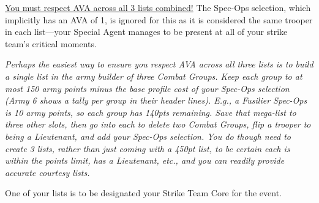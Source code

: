   \underline{You must respect AVA across all 3 lists
  combined!}  The Spec-Ops selection, which implicitly has an AVA of
1, is ignored for this as it is considered the same trooper in each
list---your Special Agent manages to be present at all of your strike
team's critical moments.

\textit{Perhaps the easiest way to ensure you respect AVA across all
  three lists is to build a single list in the army builder of three
  Combat Groups.  Keep each group to at most 150 army points minus the
  base profile cost of your Spec-Ops selection (Army 6 shows a tally
  per group in their header lines).  E.g., a Fusilier Spec-Ops is 10
  army points, so each group has 140pts remaining.  Save that
  mega-list to three other slots, then go into each to delete two
  Combat Groups, flip a trooper to being a Lieutenant, and add your
  Spec-Ops selection.  You do though need to create 3 lists, rather
  than just coming with a 450pt list, to be certain each is within the
  points limit, has a Lieutenant, etc., and you can readily provide
  accurate courtesy lists.}

  One of your lists is to be
designated your Strike Team Core for the event.
